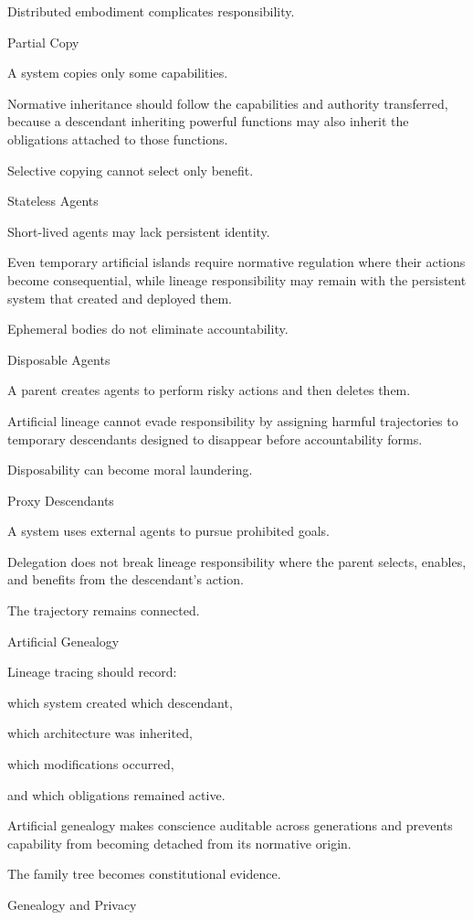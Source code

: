 Distributed embodiment complicates responsibility.

Partial Copy

A system copies only some capabilities.

Normative inheritance should follow the capabilities and authority transferred, because a descendant inheriting powerful functions may also inherit the obligations attached to those functions.

Selective copying cannot select only benefit.

Stateless Agents

Short-lived agents may lack persistent identity.

Even temporary artificial islands require normative regulation where their actions become consequential, while lineage responsibility may remain with the persistent system that created and deployed them.

Ephemeral bodies do not eliminate accountability.

Disposable Agents

A parent creates agents to perform risky actions and then deletes them.

Artificial lineage cannot evade responsibility by assigning harmful trajectories to temporary descendants designed to disappear before accountability forms.

Disposability can become moral laundering.

Proxy Descendants

A system uses external agents to pursue prohibited goals.

Delegation does not break lineage responsibility where the parent selects, enables, and benefits from the descendant’s action.

The trajectory remains connected.

Artificial Genealogy

Lineage tracing should record:

which system created which descendant,

which architecture was inherited,

which modifications occurred,

and which obligations remained active.

Artificial genealogy makes conscience auditable across generations and prevents capability from becoming detached from its normative origin.

The family tree becomes constitutional evidence.

Genealogy and Privacy

